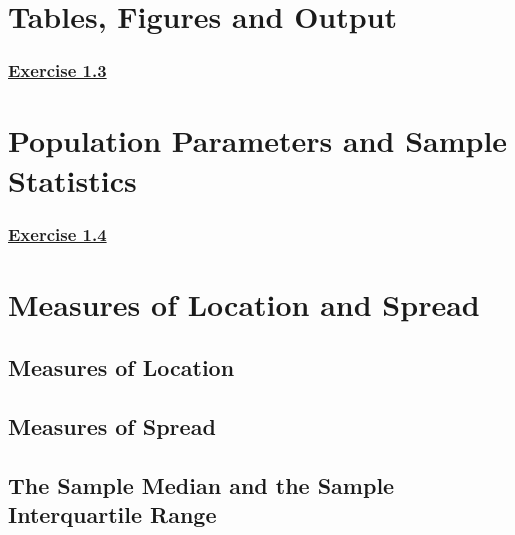 \documentclass[
  11pt,
]{book}
\begin{document}
\section{Tables, Figures and Output}\label{tables-figures-and-output}

\subsubsection*{\texorpdfstring{\hyperref[ex13a]{Exercise 1.3}}{Exercise 1.3}}\label{exercise-1.3}

\section{Population Parameters and Sample Statistics}\label{population-parameters-and-sample-statistics}

\subsubsection*{\texorpdfstring{\hyperref[ex14a]{Exercise 1.4}}{Exercise 1.4}}\label{exercise-1.4}

\section{Measures of Location and Spread}\label{measures-of-location-and-spread}

\subsection*{Measures of Location}\label{measures-of-location}

\subsection*{Measures of Spread}\label{measures-of-spread}

\subsection*{The Sample Median and the Sample Interquartile Range}\label{the-sample-median-and-the-sample-interquartile-range}
\end{document}
